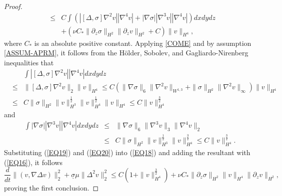 \documentclass[12pt,reqno]{amsart}
\numberwithin{equation}{section}
\begin{document}
\begin{proof}
\begin{eqnarray}
  &\leq& C\int(|[\Delta,\sigma]\nabla^2v||\nabla^4v|+|\nabla\sigma||\nabla^3v||\nabla^4v|)dxdydz\nonumber\\
  &&+ (\nu C_*\|\partial_z\sigma\|_{H^2}\|\partial_zv\|_{H^2}+C)\|v\|_{H^4},\label{EQ18}
\end{eqnarray}
where $C_*$ is an absolute positive constant.
Applying \eqref{COME} and by assumption \eqref{ASSUM-APRM}, it follows from the H\"older, Sobolev, and Gagliardo-Nirenberg inequalities that
\begin{eqnarray}
  &&\int|[\Delta,\sigma]\nabla^2v||\nabla^4v|dxdydz\nonumber\\
  &\leq& \|[\Delta,\sigma]\nabla^2v\|_2\|v\|_{H^4} \leq C\left(\|\nabla\sigma\|_6\|\nabla^2v\|_{W^{1,3}}+\|\sigma\|_{H^2}\|\nabla^2v\|_\infty\right)\|v\|_{H^4}\nonumber\\
  &\leq& C\|\sigma\|_{H^2}\|v\|_{H^3}^\frac12\|v\|_{H^4}^\frac12\|v\|_{H^4}\leq C\|v\|_{H^4}^\frac32 \label{EQ19}
\end{eqnarray}
and
\begin{eqnarray}
  \int|\nabla\sigma||\nabla^3v||\nabla^4v|dxdydz
  &\leq&\|\nabla\sigma\|_6\|\nabla^3v\|_3\|\nabla^4v\|_2\nonumber\\
  &\leq& C\|\sigma\|_{H^2}\|v\|_{H^3}^\frac12\|v\|_{H^4}^\frac32 \leq C\|v\|_{H^4}^\frac32. \label{EQ20}
\end{eqnarray}
Substituting (\ref{EQ19}) and (\ref{EQ20}) into (\ref{EQ18}) and adding the resultant with (\ref{EQ16}), it follows
\begin{equation}
  \frac{d}{dt}\|(v,\nabla\Delta v)\|_2^2+\underline\sigma \mu\|\Delta^2v\|_2^2
  \leq C(1+\|v\|_{H^4}^\frac32)+\nu C_*\|\partial_z\sigma\|_{H^2}\|v\|_{H^4}\|\partial_zv\|_{H^2},\label{EQ34}
\end{equation}
proving the first conclusion.



\end{proof}
\end{document}
